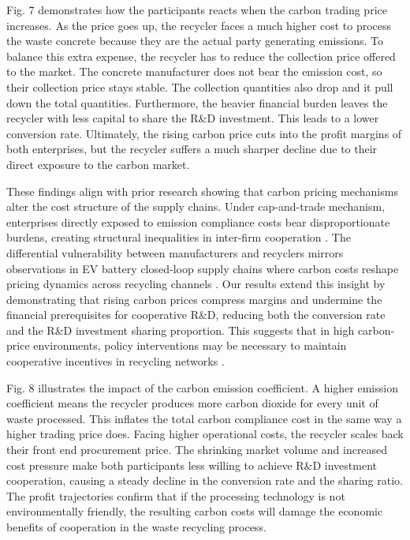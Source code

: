 \documentclass[authoryear,preprint,review,times,10pt]{elsarticle}
\begin{document}
Fig. 7 demonstrates how the participants reacts when the carbon trading price increases. As the price goes up, the recycler faces a much higher cost to process the waste concrete because they are the actual party generating emissions. To balance this extra expense, the recycler has to reduce the collection price offered to the market. The concrete manufacturer does not bear the emission cost, so their collection price stays stable. The collection quantities also drop and it pull down the total quantities. Furthermore, the heavier financial burden leaves the recycler with less capital to share the R\&D investment. This leads to a lower conversion rate. Ultimately, the rising carbon price cuts into the profit margins of both enterprises, but the recycler suffers a much sharper decline due to their direct exposure to the carbon market.

These findings align with prior research showing that carbon pricing mechanisms alter the cost structure of the supply chains. Under cap-and-trade mechanism, enterprises directly exposed to emission compliance costs bear disproportionate burdens, creating structural inequalities in inter-firm cooperation \citep{bai2022Distributionally}. The differential vulnerability between manufacturers and recyclers mirrors observations in EV battery closed-loop supply chains where carbon costs reshape pricing dynamics across recycling channels \citep{wu2024Electric}. Our results extend this insight by demonstrating that rising carbon prices compress margins and undermine the financial prerequisites for cooperative R\&D, reducing both the conversion rate and the R\&D investment sharing proportion. This suggests that in high carbon-price environments, policy interventions may be necessary to maintain cooperative incentives in recycling networks \citep{huang2024Optimal}.


Fig. 8 illustrates the impact of the carbon emission coefficient. A higher emission coefficient means the recycler produces more carbon dioxide for every unit of waste processed. This inflates the total carbon compliance cost in the same way a higher trading price does. Facing higher operational costs, the recycler scales back their front end procurement price. The shrinking market volume and increased cost pressure make both participants less willing to achieve R\&D investment cooperation, causing a steady decline in the conversion rate and the sharing ratio. The profit trajectories confirm that if the processing technology is not environmentally friendly, the resulting carbon costs will damage the economic benefits of cooperation in the waste recycling process.
\end{document}
